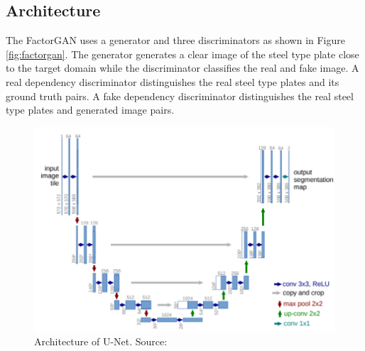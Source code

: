 \subsection{Architecture}
The FactorGAN uses a generator and three discriminators as shown in Figure \ref{fig:factorgan}. The generator generates a clear image of the steel type plate close to the target domain while the discriminator classifies the real and fake image. A real dependency discriminator distinguishes the real steel type plates and its ground truth pairs. A fake dependency discriminator distinguishes the real steel type plates and generated image pairs. 
\begin{figure}
\centering
\includegraphics[width=5in]{images/unet.PNG}
\caption[Architecture of U-Net]{Architecture of U-Net. Source: \citep{ronneberger2015u}}\label{fig:unet}
\end{figure}
